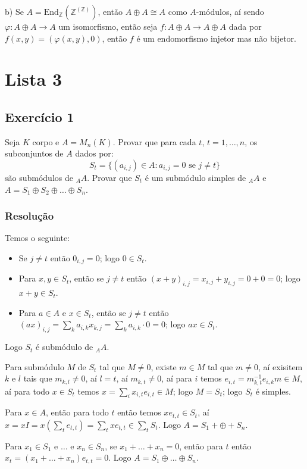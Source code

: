 \documentclass[10pt,a4paper]{article}
\begin{document}
\medskip
\noindent
b) Se $A=\mathrm{End}_\mathbb{Z}(\mathbb{Z}^{(\mathbb{Z})})$, então $A\oplus A\cong A$ como $A$-módulos, aí sendo $\varphi:A\oplus A\rightarrow A$ um isomorfismo, então seja $f:A\oplus A\rightarrow A\oplus A$ dada por $f(x,y)=(\varphi(x,y),0)$, então $f$ é um endomorfismo injetor mas não bijetor.

\newpage

\section*{Lista 3}

\subsection*{Exercício 1}

Seja $K$ corpo e $A=M_n(K)$. Provar que para cada $t$, $t=1,\dots, n$, os subconjuntos de $A$ dados por:
\[
S_t=\{(a_{i,j})\in A:a_{i,j}=0\text{ se }j\neq t\}
\]
são submódulos de $_AA$. Provar que $S_t$ é um submódulo simples de $_AA$ e $A=S_1\oplus S_2\oplus\dots\oplus S_n$.

\subsubsection*{Resolução}

Temos o seguinte:
\begin{itemize}
\item Se $j\neq t$ então $0_{i,j}=0$; logo $0\in S_t$.
\item Para $x,y\in S_t$, então se $j\neq t$ então $(x+y)_{i,j}=x_{i,j}+y_{i,j}=0+0=0$; logo $x+y\in S_t$.
\item Para $a\in A$ e $x\in S_t$, então se $j\neq t$ então $(ax)_{i,j}=\sum_ka_{i,k}x_{k,j}=\sum_ka_{i,k}\cdot0=0$; logo $ax\in S_t$.
\end{itemize}
Logo $S_t$ é submódulo de $_AA$.

\medskip
\noindent
Para submódulo $M$ de $S_t$ tal que $M\neq 0$, existe $m\in M$ tal que $m\neq 0$, aí exisitem $k$ e $l$ tais que $m_{k,l}\neq 0$, aí $l=t$, aí $m_{k,t}\neq 0$, aí para $i$ temos $e_{i,t}=m_{k,t}^{-1}e_{i,k}m\in M$, aí para todo $x\in S_t$ temos $x=\sum_ix_{i,t}e_{i,t}\in M$; logo $M=S_t$; logo $S_t$ é simples.

\medskip
\noindent
Para $x\in A$, então para todo $t$ então temos $xe_{t,t}\in S_t$, aí $x=xI=x(\sum_te_{t,t})=\sum_txe_{t,t}\in\sum_tS_t$. Logo $A=S_1+\oplus+S_n$.

\medskip
\noindent
Para $x_1\in S_1$ e $\dots$ e $x_n\in S_n$, se $x_1+\dots+x_n=0$, então para $t$ então $x_t=(x_1+\dots+x_n)e_{t,t}=0$. Logo $A=S_1\oplus\dots\oplus S_n$.
\end{document}
